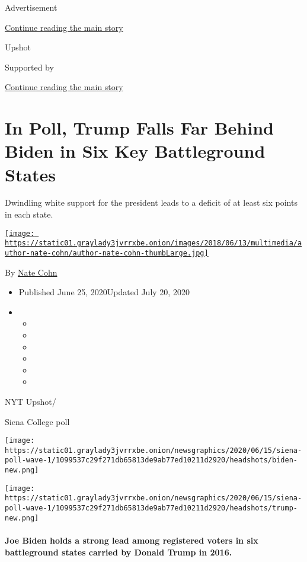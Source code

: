 Advertisement

\protect\hyperlink{after-top}{Continue reading the main story}

Upshot

Supported by

\protect\hyperlink{after-sponsor}{Continue reading the main story}

\hypertarget{in-poll-trump-falls-far-behind-biden-in-six-key-battleground-states}{%
\section{In Poll, Trump Falls Far Behind Biden in Six Key Battleground
States}\label{in-poll-trump-falls-far-behind-biden-in-six-key-battleground-states}}

Dwindling white support for the president leads to a deficit of at least
six points in each state.

\href{https://www.nytimes3xbfgragh.onion/by/nate-cohn}{\texttt{[image: https://static01.graylady3jvrrxbe.onion/images/2018/06/13/multimedia/author-nate-cohn/author-nate-cohn-thumbLarge.jpg]}}

By \href{https://www.nytimes3xbfgragh.onion/by/nate-cohn}{Nate Cohn}

\begin{itemize}
\item
  Published June 25, 2020Updated July 20, 2020
\item
  \begin{itemize}
  \item
  \item
  \item
  \item
  \item
  \item
  \end{itemize}
\end{itemize}

NYT Upshot/

Siena College poll

\texttt{[image: https://static01.graylady3jvrrxbe.onion/newsgraphics/2020/06/15/siena-poll-wave-1/1099537c29f271db65813de9ab77ed10211d2920/headshots/biden-new.png]}

\texttt{[image: https://static01.graylady3jvrrxbe.onion/newsgraphics/2020/06/15/siena-poll-wave-1/1099537c29f271db65813de9ab77ed10211d2920/headshots/trump-new.png]}

\hypertarget{joe-biden-holds-a-strong-lead-among-registered-voters-in-six-battleground-states-carried-by-donald-trump-in-2016}{%
\paragraph{Joe Biden holds a strong lead among registered voters in six
battleground states carried by Donald Trump in
2016.}\label{joe-biden-holds-a-strong-lead-among-registered-voters-in-six-battleground-states-carried-by-donald-trump-in-2016}}

